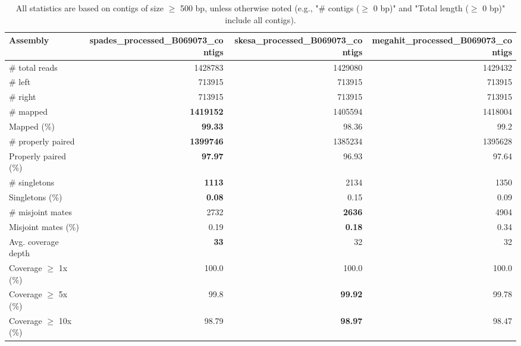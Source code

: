 \documentclass[12pt,a4paper]{article}
\begin{document}
\begin{table}[ht]
\begin{center}
\caption{All statistics are based on contigs of size $\geq$ 500 bp, unless otherwise noted (e.g., "\# contigs ($\geq$ 0 bp)" and "Total length ($\geq$ 0 bp)" include all contigs).}
\begin{tabular}{|l*{3}{|r}|}
\hline
Assembly & spades\_processed\_B069073\_contigs & skesa\_processed\_B069073\_contigs & megahit\_processed\_B069073\_contigs \\ \hline
\# total reads & 1428783 & 1429080 & 1429432 \\ \hline
\# left & 713915 & 713915 & 713915 \\ \hline
\# right & 713915 & 713915 & 713915 \\ \hline
\# mapped & {\bf 1419152} & 1405594 & 1418004 \\ \hline
Mapped (\%) & {\bf 99.33} & 98.36 & 99.2 \\ \hline
\# properly paired & {\bf 1399746} & 1385234 & 1395628 \\ \hline
Properly paired (\%) & {\bf 97.97} & 96.93 & 97.64 \\ \hline
\# singletons & {\bf 1113} & 2134 & 1350 \\ \hline
Singletons (\%) & {\bf 0.08} & 0.15 & 0.09 \\ \hline
\# misjoint mates & 2732 & {\bf 2636} & 4904 \\ \hline
Misjoint mates (\%) & 0.19 & {\bf 0.18} & 0.34 \\ \hline
Avg. coverage depth & {\bf 33} & 32 & 32 \\ \hline
Coverage $\geq$ 1x (\%) & 100.0 & 100.0 & 100.0 \\ \hline
Coverage $\geq$ 5x (\%) & 99.8 & {\bf 99.92} & 99.78 \\ \hline
Coverage $\geq$ 10x (\%) & 98.79 & {\bf 98.97} & 98.47 \\ \hline
\end{tabular}
\end{center}
\end{table}
\end{document}
